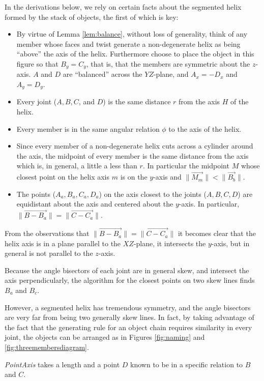 \documentclass[mathematics,article,submit,pdftex,moreauthors]{Definitions/mdpi}
\begin{document}
In the derivations below, we rely on certain facts about
the segmented helix formed by the stack of objects, the first
of which is key:
\begin{itemize}
\item By virtue of Lemma \ref{lem:balance}, without loss of generality, think of any member whose faces
  and twist generate a non-degenerate helix as being ``above'' the
  axis of the helix. Furthermore choose to place the object in
  this figure so that $B_y = C_y$, that is, that the members are symmetric
  about the $z$-axis.
  $A$ and $D$ are ``balanced'' across the $YZ$-plane,
  and $A_x = -D_x$ and $A_y = D_y$.
\item Every joint ($A,B,C$, and $D$) is the same distance $r$ from the axis $H$ of the helix.
\item Every member is in the same angular relation $\phi$ to the axis of the helix.
\item Since every member of a non-degenerate helix cuts across a cylinder around the axis,
  the midpoint of every member is the same distance from the axis
  which is, in general, a little a less than $r$. In particular the midpoint $M$
  whose closest point on the helix axis $m$ is on the $y$-axis and
  $\| \overrightarrow{M_m} \| < \| \overrightarrow{B_b} \|$.
\item The points ($A_a,B_a,C_a,D_a$) on the axis closest to the joints ($A,B,C,D$)
  are equidistant about the axis and centered about the $y$-axis. In
  particular, $\| \overrightarrow{B - B_a} \| = \| \overrightarrow{C - C_a} \|$.
\end{itemize}

From the observations that $\| \overrightarrow{B - B_a} \| = \| \overrightarrow{C - C_a} \|$
it becomes clear that the helix axis is in a plane
parallel to the $XZ$-plane, it intersects the $y$-axis, but in general is
not parallel to the $z$-axis.

Because the angle bisectors of each joint are in general skew, and intersect the
axis perpendicularly, the algorithm
for the closest points on two skew lines finds $B_a$ and $B_c$.

However, a segmented helix has
tremendous symmetry, and the angle bisectors are very far from being two
generally skew lines. In fact, by taking advantage of the fact that the
generating rule for an object chain requires similarity in every joint,
the objects can be arranged as in Figures \ref{fig:naming} and \ref{fig:threemembersdiagram}.

{\em PointAxis} takes a length and a point $D$ known to be in
a specific relation to $B$ and $C$.
\end{document}
